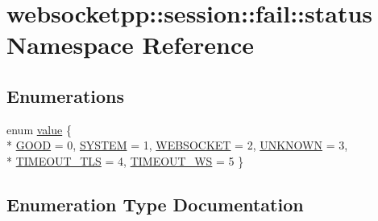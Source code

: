 \hypertarget{namespacewebsocketpp_1_1session_1_1fail_1_1status}{}\section{websocketpp\+:\+:session\+:\+:fail\+:\+:status Namespace Reference}
\label{namespacewebsocketpp_1_1session_1_1fail_1_1status}
\subsection*{Enumerations}
\begin{DoxyCompactItemize}
\item 
enum \hyperlink{namespacewebsocketpp_1_1session_1_1fail_1_1status_aacdd56a3041c036374e5aad5f8bc575f}{value} \{ \\*
\hyperlink{namespacewebsocketpp_1_1session_1_1fail_1_1status_aacdd56a3041c036374e5aad5f8bc575fab930266e402ace4fff04e3686f80fd47}{G\+O\+O\+D} = 0, 
\hyperlink{namespacewebsocketpp_1_1session_1_1fail_1_1status_aacdd56a3041c036374e5aad5f8bc575fa6983930ac9d7a38851b3608f66fdb2ad}{S\+Y\+S\+T\+E\+M} = 1, 
\hyperlink{namespacewebsocketpp_1_1session_1_1fail_1_1status_aacdd56a3041c036374e5aad5f8bc575fa6831c2bcd529486b9386567f342476a6}{W\+E\+B\+S\+O\+C\+K\+E\+T} = 2, 
\hyperlink{namespacewebsocketpp_1_1session_1_1fail_1_1status_aacdd56a3041c036374e5aad5f8bc575fad552b3b75c4b189d33bdc7b29db67802}{U\+N\+K\+N\+O\+W\+N} = 3, 
\\*
\hyperlink{namespacewebsocketpp_1_1session_1_1fail_1_1status_aacdd56a3041c036374e5aad5f8bc575fa590003c0ade565dd66bd0de38bf2cac7}{T\+I\+M\+E\+O\+U\+T\+\_\+\+T\+L\+S} = 4, 
\hyperlink{namespacewebsocketpp_1_1session_1_1fail_1_1status_aacdd56a3041c036374e5aad5f8bc575fabddca80f0014aaa2a567615f904b9d93}{T\+I\+M\+E\+O\+U\+T\+\_\+\+W\+S} = 5
 \}
\end{DoxyCompactItemize}


\subsection{Enumeration Type Documentation}
\hypertarget{namespacewebsocketpp_1_1session_1_1fail_1_1status_aacdd56a3041c036374e5aad5f8bc575f}{}
